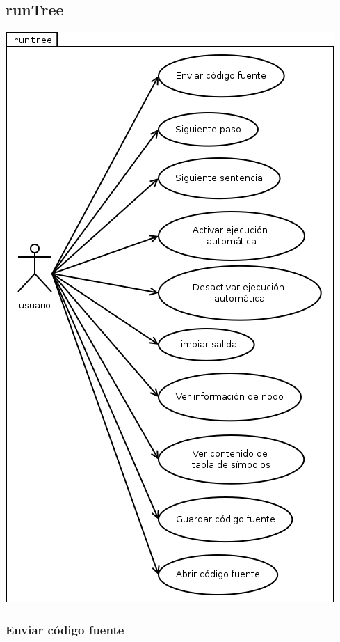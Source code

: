 \subsection {runTree}
\begin{center}
\includegraphics[scale=0.5]{runtree.png} \\
\end{center}
\subsubsection{Enviar código fuente} 

